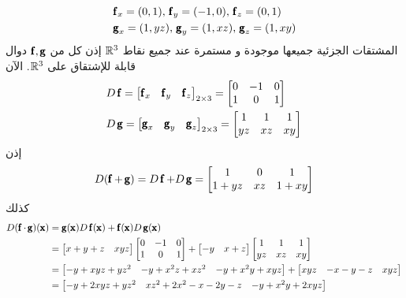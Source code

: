\begin{solution}
\begin{align*}
   & \f_x=(0,1),\,\f_y=(-1,0),\,\f_z=(0,1)\\
   & \g_x=(1,yz),\,\g_y=(1,xz),\,\g_z=(1,xy)
\end{align*}
المشتقات الجزئية جميعها موجودة و مستمرة عند جميع نقاط $\R^3$ إذن كل من $\f,\g$ دوال قابلة للإشتقاق على $\R^3$. الآن
\begin{align*}
   & D\f=\begin{bmatrix}
        \f_x&\f_y&\f_z
    \end{bmatrix}_{2\times3}=\begin{bmatrix}
        0&-1&0\\
        1&0&1
    \end{bmatrix}\\
   & D\g=\begin{bmatrix}
        \g_x&\g_y&\g_z
    \end{bmatrix}_{2\times3}=\begin{bmatrix}
        1&1&1\\
        yz&xz&xy
    \end{bmatrix} 
\end{align*}
إذن
\[
D(\f+\g)=D\f+D\g=\begin{bmatrix}
    1&0&1\\
    1+yz&xz&1+xy
\end{bmatrix}
\]
كذلك
\begin{align*}
    D(\f\cdot\g)(\x)&=\g(\x)D\f(\x)+\f(\x)D\g(\x)\\
    &=\begin{bmatrix}
        x+y+z&xyz
    \end{bmatrix}\begin{bmatrix}
        0&-1&0\\
        1&0&1
    \end{bmatrix}+\begin{bmatrix}
        -y&x+z
    \end{bmatrix}\begin{bmatrix}
        1&1&1\\
        yz&xz&xy
    \end{bmatrix}\\
    &=\begin{bmatrix}
        -y+xyz+yz^2&-y+x^2z+xz^2&-y+x^2y+xyz
    \end{bmatrix}+\begin{bmatrix}
        xyz&-x-y-z&xyz
    \end{bmatrix}\\
    &=\begin{bmatrix}
        -y+2xyz+yz^2&xz^2+2x^2-x-2y-z&-y+x^2y+2xyz
    \end{bmatrix}
\end{align*}

\end{solution}

